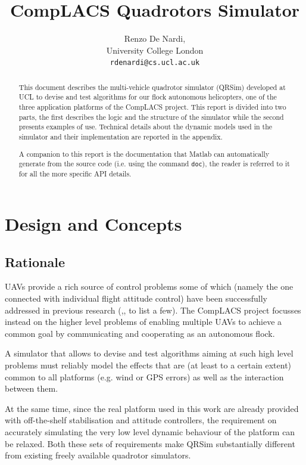 \documentclass[a4paper,11pt]{report}
\title{{CompLACS} Quadrotors Simulator}
\author{Renzo De Nardi,\\University College London\\\texttt{rdenardi@cs.ucl.ac.uk}}
\newcommand{\sname}{QRSim\xspace}
\begin{document}
\maketitle

\begin{abstract}
This document describes the multi-vehicle quadrotor simulator (\sname) developed at UCL to devise and test algorithms for our flock autonomous helicopters, one of the three application platforms of the {CompLACS} project.
This report is divided into two parts, the first describes the logic and the structure of the simulator while the second presents examples of use. 
Technical details about the dynamic models used in the simulator and their implementation are reported in the appendix. 

A companion to this report is the documentation that Matlab can automatically generate from the source code (i.e. using the command \texttt{doc}), the reader is referred to it for all the more specific API details.
\end{abstract}

\tableofcontents

\chapter{Design and Concepts}

\section{Rationale}\label{sec:rationale}
UAVs provide a rich source of control problems some of which (namely the one connected with individual flight attitude control) have been successfully addressed in previous research (\cite{hoffman08quadrotor},\cite{shim03aflight},\cite{bouabdallah07phd} to list a few). The {CompLACS} project focusses instead on the higher level problems of enabling multiple UAVs to achieve a common goal by communicating and cooperating as an autonomous flock. 

A simulator that allows to devise and test algorithms aiming at such high level problems must reliably model the effects that are (at least to a certain extent) common to all platforms (e.g. wind or GPS errors) as well as the interaction between them.
 
At the same time, since the real platform used in this work are already provided with off-the-shelf stabilisation and attitude controllers, the requirement on accurately simulating the very low level dynamic behaviour of the platform can be relaxed.
Both these sets of requirements make \sname substantially different from existing freely available quadrotor simulators. 
\end{document}
